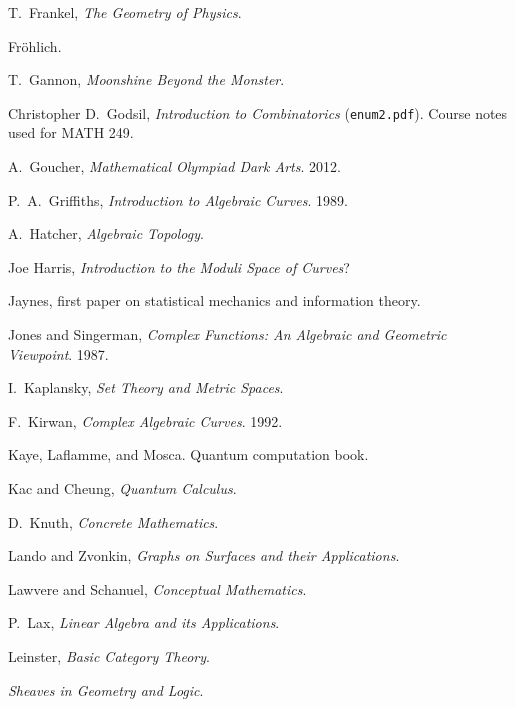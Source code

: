 \begin{thebibliography}{}
T.\ Frankel, \emph{The Geometry of Physics}.

Fr\"ohlich.

T.\ Gannon, \emph{Moonshine Beyond the Monster}.

Christopher D.\ Godsil, \emph{Introduction to Combinatorics} (\texttt{enum2.pdf}). Course notes used for MATH 249.

A.\ Goucher, \emph{Mathematical Olympiad Dark Arts}. 2012.

P.\ A.\ Griffiths, \emph{Introduction to Algebraic Curves}. 1989.

A.\ Hatcher, \emph{Algebraic Topology}.

Joe Harris, \emph{Introduction to the Moduli Space of Curves}?

Jaynes, first paper on statistical mechanics and information theory.

Jones and Singerman, \emph{Complex Functions: An Algebraic and Geometric Viewpoint}. 1987.

I.\ Kaplansky, \emph{Set Theory and Metric Spaces}.

F.\ Kirwan, \emph{Complex Algebraic Curves}. 1992.

Kaye, Laflamme, and Mosca. Quantum computation book.

Kac and Cheung, \emph{Quantum Calculus}.

D.\ Knuth, \emph{Concrete Mathematics}.

Lando and Zvonkin, \emph{Graphs on Surfaces and their Applications}.

Lawvere and Schanuel, \emph{Conceptual Mathematics}.

P.\ Lax, \emph{Linear Algebra and its Applications}.

Leinster, \emph{Basic Category Theory}.

\emph{Sheaves in Geometry and Logic}.


\end{thebibliography}
